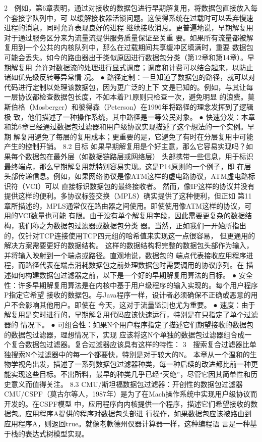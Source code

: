                                                          2
   例如，第6章表明，通过对接收的数据包进行早期解复用，将数据包直接放入每个套接字队列中，可
   以缓解接收器活锁问题。这使得系统在过载时可以丢弃慢速进程的消息，同时允许表现良好的进程
   继续接收消息。更普遍地说，早期解复用对于通过服务区分来为流量流提供服务质量保证至关重
   要。如果所有流量都被解复用到一个公共的内核队列中，那么在过载期间共享缓冲区填满时，重要
   数据包可能会丢失。如今的路由器出于类似原因进行数据包分类（第12章和第14章）。早期解复用
   允许对数据流的处理进行显式调度；调度和计费可以结合起来，以防止诸如优先级反转等异常情
   况。
 ● 路径定制：一旦知道了数据包的路径，就可以对代码进行定制以处理该数据包，因为更广泛的上下
   文是已知的。例如，与其让每一层协议都检查数据包长度，不如本着P1原则只检查一次，避免明显
   的浪费。莫斯伯格（Mosberger）和彼得森（Peterson）在1996年将路径的理念发挥到了逻辑极
   致，他们描述了一种操作系统，其中路径是一等公民对象。
 ● 快速分发：本章和第6章已经通过数据包过滤器和用户级协议实现描述了这个想法的一个实例。早期
   解复用避免了每层的复用成本；更重要的是，它避免了有时在分层复用中可能产生的控制开销。
8.2 目标
如果早期解复用是个好主意，那么它容易实现吗？如果每个数据包在最外层（如数据链路层或网络层）
头部携带一些信息，用于标识最终端点，那么早期解复用就特别容易实现。这是P14原则的一个例子，即
在层头部传递信息。例如，如果网络协议是像ATM这样的虚电路协议，ATM虚电路标识符（VCI）可以
直接标识数据包的最终接收者。
然而，像IP这样的协议并没有提供这样的便利。多协议标签交换（MPLS）确实提供了这种便利，但正如
第11章所描述的，MPLS通常仅在路由器之间使用。即使使用像ATM这样的协议，可用的VCI数量也可能
有限。由于没有单个解复用字段，因此需要更复杂的数据结构，我们称之为数据包过滤器或数据包分类
器。当然，正如我们一开始所指出的，仅针对TCP连接使用TCP四元组的哈希值来实现这一点很容易，
但更通用的解决方案需要更好的数据结构。
这样的数据结构将完整的数据包头部作为输入，并将输入映射到一个端点或路径。直观地说，数据包的
端点代表接收应用程序进程，而路径代表在端点消耗数据包之前处理数据包时需要调用的协议序列。在
描述如何构建数据包过滤器之前，以下是一个好的早期解复用算法的目标。
 ● 安全性：许多早期解复用算法是在内核中基于用户级程序的输入实现的。每个用户程序P指定它希望
   接收的数据包。与Java程序一样，设计者必须确保不正确或恶意的用户不会影响其他用户。即使在
   今天，这对于流量监测也尤为重要。
 ● 速度：由于解复用是实时进行的，早期解复用代码应该快速运行，特别是在只指定了单个过滤器的
   情况下。
 ● 可组合性：如果N个用户程序指定了描述它们期望接收的数据包的数据包过滤器，理想情况下，实现
   应该将这N个单独的数据包过滤器组合成一个复合数据包过滤器。复合过滤器应该具有这样的特性：
                                                      3
  搜索复合过滤器比单独搜索N个过滤器中的每一个都要快，特别是对于较大的N。
本章从一个温和的生物学视角出发，描述了一系列数据包过滤器种类，每一种后续的改进都比前一种更
能实现这些目标。不出所料，最早的种类几乎已经“灭绝”，尽管它因其简单性和历史意义而值得关注。
8.3 CMU/斯坦福数据包过滤器：开创性的数据包过滤器
CMU/CSPF（莫古尔等人，1987年）是为了在Mach操作系统中实现用户级协议而开发的。在CSPF模型
中，应用程序向内核提供一个程序，描述它们希望接收的数据包。应用程序A提供的程序对数据包头部进
行操作，如果数据包应该被路由到应用程序A，则返回true。就像老款德州仪器计算器一样，这种编程语
言是一种基于栈的表达式树模型实现。




